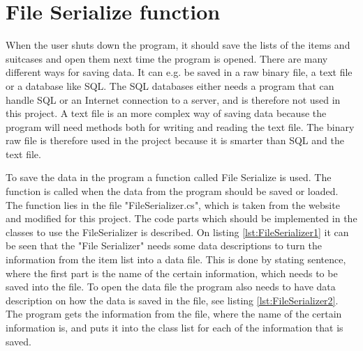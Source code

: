 \section{File Serialize function}
When the user shuts down the program, it should save the lists of the items and suitcases and open them next time the program is opened. There are many different ways for saving data. It can e.g. be saved in a raw binary file, a text file or a database like SQL.
The SQL databases either needs a program that can handle SQL or an Internet connection to a server, and is therefore not used in this project. A text file is an more complex way of saving data because the program will need methods both for writing and reading the text file. The binary raw file is therefore used in the project because it is smarter than SQL and the text file.

To save the data in the program a function called File Serialize is used. The function is called when the data from the program should be saved or loaded. The function lies in the file "FileSerializer.cs", which is taken from the website \citep{FileSeria} and modified for this project. The code parts which should be implemented in the classes to use the FileSerializer is described.
On listing \ref{lst:FileSerializer1} it can be seen that the "File Serializer" needs some data descriptions to turn the information from the item list into a data file. This is done by stating sentence, where the first part is the name of the certain information, which needs to be saved into the file. 
To open the data file the program also needs to have data description on how the data is saved in the file, see listing \ref{lst:FileSerializer2}. The program gets the information from the file, where the name of the certain information is, and puts it into the class list for each of the information that is saved.